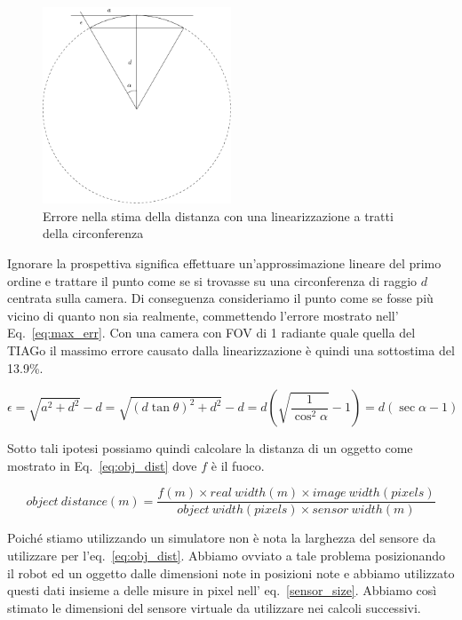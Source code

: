 \documentclass[a4paper]{article}
\begin{document}
	\begin{figure}[H]
		\centering
		\includegraphics[width=0.5\textwidth]{./img/linearization_error.pdf}
		\caption{Errore nella stima della distanza con una linearizzazione a tratti della circonferenza}
		\label{fig:error}
	\end{figure}

	Ignorare la prospettiva significa effettuare un'approssimazione lineare del
	primo ordine e trattare il punto come se si trovasse su una circonferenza
	di raggio $d$ centrata sulla camera. Di conseguenza consideriamo il punto
	come se fosse più vicino di quanto non sia realmente, commettendo l'errore
	mostrato nell' Eq.~\ref{eq:max_err}. Con una camera con FOV di 1 radiante
	quale quella del TIAGo il massimo errore causato dalla linearizzazione è
	quindi una sottostima del 13.9\%.
	
	\begin{equation}
	\epsilon = 
	\sqrt{a^2+d^2} - d =
	\sqrt{(d\tan \theta )^2+d^2}-d =
	d\left( \sqrt{\frac{1}{\cos ^2 \alpha}}-1 \right) =
	d \left( \sec \alpha -1 \right) 
	\label{eq:max_err}
	\end{equation}
	
	Sotto tali ipotesi possiamo quindi calcolare la distanza di un oggetto come
	mostrato in Eq.~\ref{eq:obj_dist} dove $f$ è il fuoco.
	
	\begin{equation}\label{eq:obj_dist}
	object~distance(m) = 
	\frac{f(m) \times real~width(m) \times image~width(pixels)}
	{object~width(pixels) \times sensor~width(m)}
	\end{equation}
	
	Poiché stiamo utilizzando un simulatore non è nota la larghezza del sensore
	da utilizzare per l'eq.~\ref{eq:obj_dist}. Abbiamo ovviato a tale problema
	posizionando il robot ed un oggetto dalle dimensioni note in posizioni note
	e abbiamo utilizzato questi dati insieme a delle misure in pixel nell'
	eq.~\ref{sensor_size}. Abbiamo così stimato le dimensioni del sensore
	virtuale da utilizzare nei calcoli successivi.
\end{document}
